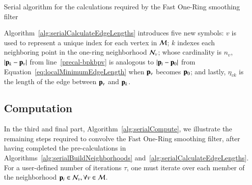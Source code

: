 %
%
\begin{algorithm}
	\DontPrintSemicolon


	\bigskip
	\;
\nl	{}
	\caption{Serial algorithm for the calculations required by the Fast One-Ring smoothing filter\label{alg:serialCalculateEdgeLengths}}
\end{algorithm}

Algorithm~\ref{alg:serialCalculateEdgeLengths} introduces five new symbols: $v$ is used to represent a unique index for each vertex in $\mathcal{M}$; $k$ indexes each neighboring point in the one-ring neighborhood $\mathcal{N}_v$; whose cardinality is $n_v$, $|\mathbf{p}_k-\mathbf{p}_v|$ from line~\ref{precal-bpkbpv} is analogous to $|\mathbf{p}_i-\mathbf{p}_0|$ from Equation~\ref{eq:localMinimumEdgeLength} when $\mathbf{p}_v$ becomes $\mathbf{p}_0$; and lastly, $\eta_{vk}$ is the length of the edge between $\mathbf{p}_v$ and $\mathbf{p}_k$.%
%
\subsection{Computation}
In the third and final part, Algorithm~\ref{alg:serialCompute}, we illustrate the remaining steps required to convolve the Fast One-Ring smoothing filter, after having completed the pre-calculations in Algorithms~\ref{alg:serialBuildNeighborhoods} and~\ref{alg:serialCalculateEdgeLengths}. For a user-defined number of iterations $\tau$, one must iterate over each member of the neighborhood $\mathbf{p}_i \in \mathcal{N}_v, \forall v \in \mathcal{M}$.


